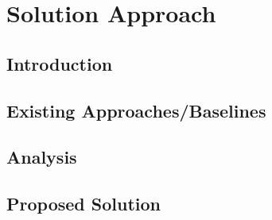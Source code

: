 
\chapter{Solution Approach}
\label{ch:solution}

\section{Introduction}
 
\section{Existing Approaches/Baselines}

\section{Analysis}

\section{Proposed Solution}
